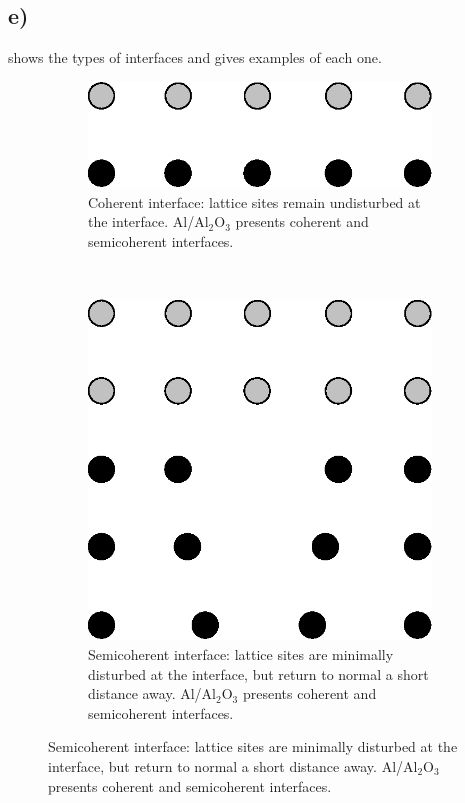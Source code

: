 \documentclass[a4paper]{article}
\begin{document}
	\subsection{e)}
	 shows the types of interfaces and gives examples of each one.
	\begin{figure}
		\centering
		\begin{subfigure}[t]{0.3\linewidth}
			\centering
			\includegraphics[width=\linewidth]{cohint.eps}
			\caption{Coherent interface: lattice sites remain undisturbed at the interface. Al/Al$_{2}$O$_{3}$ presents coherent and semicoherent interfaces.}
			\label{sf:cohint}
		\end{subfigure}
		~
		\begin{subfigure}[t]{0.3\linewidth}
			\centering
			\includegraphics[width=\linewidth]{scohint.eps}
			\caption{Semicoherent interface: lattice sites are minimally disturbed at the interface, but return to normal a short distance away. Al/Al$_{2}$O$_{3}$ presents coherent and semicoherent interfaces.}

\end{subfigure}
\end{figure}
\end{document}
